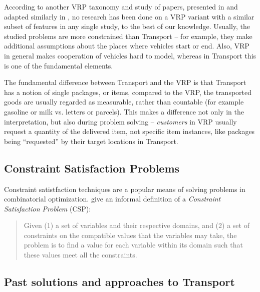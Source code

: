 According to another VRP taxonomy and study of papers, presented in \citet{Eksioglu2009} and adapted similarly in \citet{Braekers2016}, no research has been done on a VRP variant with a similar subset of features in any single study, to the best of our knowledge.
Usually, the studied problems are more constrained than Transport -- for example, they make additional assumptions about the places where vehicles start or end. Also, VRP in general
makes cooperation of vehicles hard to model, whereas in Transport this is one of the fundamental elements.


The fundamental difference between Transport and the VRP is that Transport has a notion of single packages, or items, compared to the VRP, the transported goods are usually regarded as measurable, rather than countable (for example gasoline or milk vs. letters or parcels). This makes a difference not only in the
interpretation, but also during problem solving -- \textit{customers} in VRP usually request
a quantity of the delivered item, not specific item instances, like packages being ``requested''
by their target locations in Transport. 

\subsection{Constraint Satisfaction Problems}\label{csp}

Constraint satistfaction techniques are a popular means of solving problems in combinatorial optimization. \citet[Section~8.1]{Ghallab2004} give an informal definition of a \textit{Constraint Satisfaction
Problem} (CSP):

\begin{quote}
Given (1) a set of variables and their respective domains, and (2) a set of constraints on the compatible values that the variables may take, the problem is to find a value for each variable within its domain such that these values meet all the constraints.
\end{quote}



\subsection{Past solutions and approaches to Transport}

